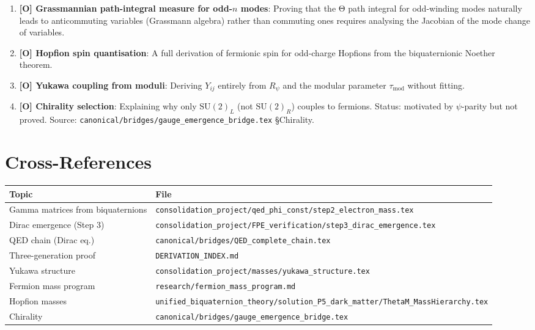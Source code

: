 \documentclass[11pt,a4paper]{article}
\begin{document}
\begin{enumerate}
  \item \textbf{[O] Grassmannian path-integral measure for odd-$n$ modes}:
    Proving that the Θ path integral for odd-winding modes naturally leads
    to anticommuting variables (Grassmann algebra) rather than commuting ones
    requires analysing the Jacobian of the mode change of variables.

  \item \textbf{[O] Hopfion spin quantisation}:
    A full derivation of fermionic spin for odd-charge Hopfions from the
    biquaternionic Noether theorem.

  \item \textbf{[O] Yukawa coupling from moduli}:
    Deriving $Y_{ij}$ entirely from $R_\psi$ and the modular parameter
    $\tau_{\mathrm{mod}}$ without fitting.

  \item \textbf{[O] Chirality selection}:
    Explaining why only $\mathrm{SU}(2)_L$ (not $\mathrm{SU}(2)_R$) couples
    to fermions.  Status: motivated by $\psi$-parity but not proved.
    Source: \texttt{canonical/bridges/gauge\_emergence\_bridge.tex} §Chirality.
\end{enumerate}

\section{Cross-References}
\label{sec:xref}

\begin{tabular}{ll}
\hline
Topic & File \\
\hline
Gamma matrices from biquaternions & \texttt{consolidation\_project/qed\_phi\_const/step2\_electron\_mass.tex} \\
Dirac emergence (Step 3) & \texttt{consolidation\_project/FPE\_verification/step3\_dirac\_emergence.tex} \\
QED chain (Dirac eq.) & \texttt{canonical/bridges/QED\_complete\_chain.tex} \\
Three-generation proof & \texttt{DERIVATION\_INDEX.md} \\
Yukawa structure & \texttt{consolidation\_project/masses/yukawa\_structure.tex} \\
Fermion mass program & \texttt{research/fermion\_mass\_program.md} \\
Hopfion masses & \texttt{unified\_biquaternion\_theory/solution\_P5\_dark\_matter/ThetaM\_MassHierarchy.tex} \\
Chirality & \texttt{canonical/bridges/gauge\_emergence\_bridge.tex} \\
\hline
\end{tabular}
\end{document}
